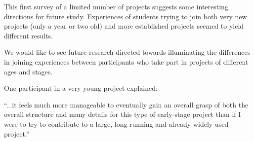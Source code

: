 
This first survey of a limited number of projects suggests some interesting directions for future study. Experiences of students trying to join both very new projects (only a year or two old) and more established projects seemed to yield different results. 

We would like to see future research directed towards illuminating the differences in joining experiences between participants who take part in projects of different ages and stages. 

One participant in a very young project explained: 

“...it feels much more manageable to eventually gain an overall grasp of both the overall structure and many details for this type of early-stage project than if I were to try to contribute to a large, long-running and already widely used project.”


